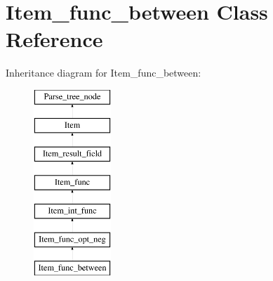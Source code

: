 \hypertarget{classItem__func__between}{}\section{Item\+\_\+func\+\_\+between Class Reference}
\label{classItem__func__between}
Inheritance diagram for Item\+\_\+func\+\_\+between\+:\begin{figure}[H]
\begin{center}
\leavevmode
\includegraphics[height=7.000000cm]{classItem__func__between}
\end{center}
\end{figure}
